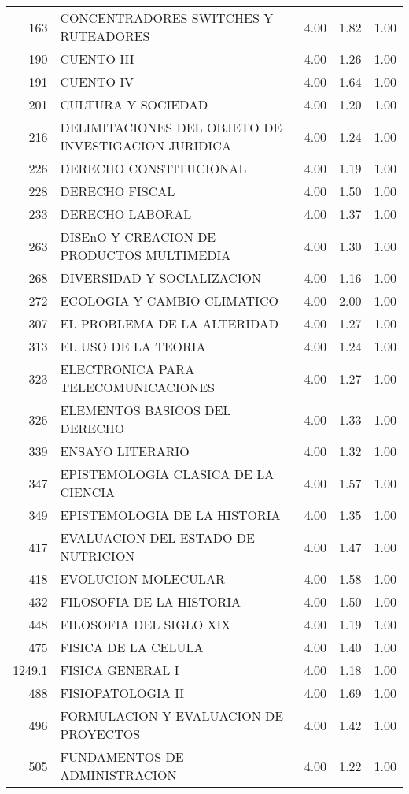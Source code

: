 \begin{table}[ht]
\begin{tabular}{rlrrr}
  163 & CONCENTRADORES SWITCHES Y RUTEADORES & 4.00 & 1.82 & 1.00 \\ 
  190 & CUENTO III & 4.00 & 1.26 & 1.00 \\ 
  191 & CUENTO IV & 4.00 & 1.64 & 1.00 \\ 
  201 & CULTURA Y SOCIEDAD & 4.00 & 1.20 & 1.00 \\ 
  216 & DELIMITACIONES DEL OBJETO DE INVESTIGACION JURIDICA & 4.00 & 1.24 & 1.00 \\ 
  226 & DERECHO CONSTITUCIONAL & 4.00 & 1.19 & 1.00 \\ 
  228 & DERECHO FISCAL & 4.00 & 1.50 & 1.00 \\ 
  233 & DERECHO LABORAL & 4.00 & 1.37 & 1.00 \\ 
  263 & DISEnO Y CREACION DE PRODUCTOS MULTIMEDIA & 4.00 & 1.30 & 1.00 \\ 
  268 & DIVERSIDAD Y SOCIALIZACION & 4.00 & 1.16 & 1.00 \\ 
  272 & ECOLOGIA Y CAMBIO CLIMATICO & 4.00 & 2.00 & 1.00 \\ 
  307 & EL PROBLEMA DE LA ALTERIDAD & 4.00 & 1.27 & 1.00 \\ 
  313 & EL USO DE LA TEORIA & 4.00 & 1.24 & 1.00 \\ 
  323 & ELECTRONICA PARA TELECOMUNICACIONES & 4.00 & 1.27 & 1.00 \\ 
  326 & ELEMENTOS BASICOS DEL DERECHO & 4.00 & 1.33 & 1.00 \\ 
  339 & ENSAYO LITERARIO & 4.00 & 1.32 & 1.00 \\ 
  347 & EPISTEMOLOGIA CLASICA DE LA CIENCIA & 4.00 & 1.57 & 1.00 \\ 
  349 & EPISTEMOLOGIA DE LA HISTORIA & 4.00 & 1.35 & 1.00 \\ 
  417 & EVALUACION DEL ESTADO DE NUTRICION & 4.00 & 1.47 & 1.00 \\ 
  418 & EVOLUCION MOLECULAR & 4.00 & 1.58 & 1.00 \\ 
  432 & FILOSOFIA DE LA HISTORIA & 4.00 & 1.50 & 1.00 \\ 
  448 & FILOSOFIA DEL SIGLO XIX & 4.00 & 1.19 & 1.00 \\ 
  475 & FISICA DE LA CELULA & 4.00 & 1.40 & 1.00 \\ 
  1249.1 & FISICA GENERAL I & 4.00 & 1.18 & 1.00 \\ 
  488 & FISIOPATOLOGIA II & 4.00 & 1.69 & 1.00 \\ 
  496 & FORMULACION Y EVALUACION DE PROYECTOS & 4.00 & 1.42 & 1.00 \\ 
  505 & FUNDAMENTOS DE ADMINISTRACION & 4.00 & 1.22 & 1.00 \\ 

\end{tabular}
\end{table}
